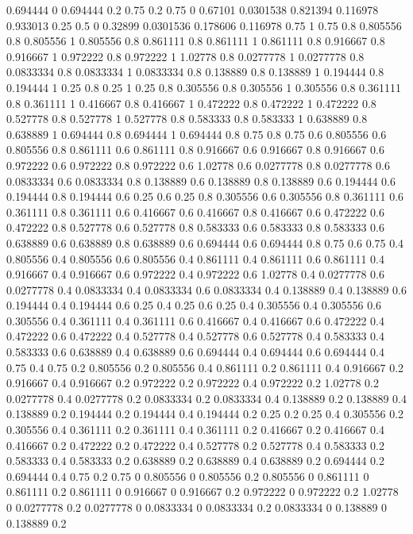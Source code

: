 0.694444 0
0.694444 0.2
0.75 0.2
0.75 0
0.67101 0.0301538
0.821394 0.116978
0.933013 0.25
0.5 0
0.32899 0.0301536
0.178606 0.116978
0.75 1
0.75 0.8
0.805556 0.8
0.805556 1
0.805556 0.8
0.861111 0.8
0.861111 1
0.861111 0.8
0.916667 0.8
0.916667 1
0.972222 0.8
0.972222 1
1.02778 0.8
0.0277778 1
0.0277778 0.8
0.0833334 0.8
0.0833334 1
0.0833334 0.8
0.138889 0.8
0.138889 1
0.194444 0.8
0.194444 1
0.25 0.8
0.25 1
0.25 0.8
0.305556 0.8
0.305556 1
0.305556 0.8
0.361111 0.8
0.361111 1
0.416667 0.8
0.416667 1
0.472222 0.8
0.472222 1
0.472222 0.8
0.527778 0.8
0.527778 1
0.527778 0.8
0.583333 0.8
0.583333 1
0.638889 0.8
0.638889 1
0.694444 0.8
0.694444 1
0.694444 0.8
0.75 0.8
0.75 0.6
0.805556 0.6
0.805556 0.8
0.861111 0.6
0.861111 0.8
0.916667 0.6
0.916667 0.8
0.916667 0.6
0.972222 0.6
0.972222 0.8
0.972222 0.6
1.02778 0.6
0.0277778 0.8
0.0277778 0.6
0.0833334 0.6
0.0833334 0.8
0.138889 0.6
0.138889 0.8
0.138889 0.6
0.194444 0.6
0.194444 0.8
0.194444 0.6
0.25 0.6
0.25 0.8
0.305556 0.6
0.305556 0.8
0.361111 0.6
0.361111 0.8
0.361111 0.6
0.416667 0.6
0.416667 0.8
0.416667 0.6
0.472222 0.6
0.472222 0.8
0.527778 0.6
0.527778 0.8
0.583333 0.6
0.583333 0.8
0.583333 0.6
0.638889 0.6
0.638889 0.8
0.638889 0.6
0.694444 0.6
0.694444 0.8
0.75 0.6
0.75 0.4
0.805556 0.4
0.805556 0.6
0.805556 0.4
0.861111 0.4
0.861111 0.6
0.861111 0.4
0.916667 0.4
0.916667 0.6
0.972222 0.4
0.972222 0.6
1.02778 0.4
0.0277778 0.6
0.0277778 0.4
0.0833334 0.4
0.0833334 0.6
0.0833334 0.4
0.138889 0.4
0.138889 0.6
0.194444 0.4
0.194444 0.6
0.25 0.4
0.25 0.6
0.25 0.4
0.305556 0.4
0.305556 0.6
0.305556 0.4
0.361111 0.4
0.361111 0.6
0.416667 0.4
0.416667 0.6
0.472222 0.4
0.472222 0.6
0.472222 0.4
0.527778 0.4
0.527778 0.6
0.527778 0.4
0.583333 0.4
0.583333 0.6
0.638889 0.4
0.638889 0.6
0.694444 0.4
0.694444 0.6
0.694444 0.4
0.75 0.4
0.75 0.2
0.805556 0.2
0.805556 0.4
0.861111 0.2
0.861111 0.4
0.916667 0.2
0.916667 0.4
0.916667 0.2
0.972222 0.2
0.972222 0.4
0.972222 0.2
1.02778 0.2
0.0277778 0.4
0.0277778 0.2
0.0833334 0.2
0.0833334 0.4
0.138889 0.2
0.138889 0.4
0.138889 0.2
0.194444 0.2
0.194444 0.4
0.194444 0.2
0.25 0.2
0.25 0.4
0.305556 0.2
0.305556 0.4
0.361111 0.2
0.361111 0.4
0.361111 0.2
0.416667 0.2
0.416667 0.4
0.416667 0.2
0.472222 0.2
0.472222 0.4
0.527778 0.2
0.527778 0.4
0.583333 0.2
0.583333 0.4
0.583333 0.2
0.638889 0.2
0.638889 0.4
0.638889 0.2
0.694444 0.2
0.694444 0.4
0.75 0.2
0.75 0
0.805556 0
0.805556 0.2
0.805556 0
0.861111 0
0.861111 0.2
0.861111 0
0.916667 0
0.916667 0.2
0.972222 0
0.972222 0.2
1.02778 0
0.0277778 0.2
0.0277778 0
0.0833334 0
0.0833334 0.2
0.0833334 0
0.138889 0
0.138889 0.2
